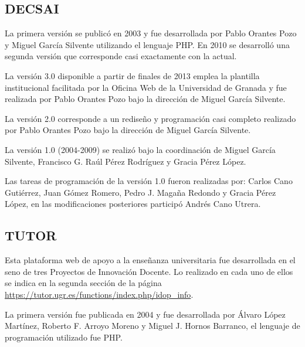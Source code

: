 \subsection{DECSAI}

La primera versión se publicó en 2003 y fue desarrollada por Pablo Orantes Pozo y Miguel García Silvente utilizando el lenguaje PHP. En 2010 se desarrolló una segunda versión que corresponde casi exactamente con la actual.

\bigskip
La versión 3.0 disponible a partir de finales de 2013 emplea la plantilla institucional facilitada por la Oficina Web de la Universidad de Granada y fue realizada por Pablo Orantes Pozo bajo la dirección de Miguel García Silvente.

\bigskip
La versión 2.0 corresponde a un rediseño y programación casi completo realizado por Pablo Orantes Pozo bajo la dirección de Miguel García Silvente.

\bigskip
La versión 1.0 (2004-2009) se realizó bajo la coordinación de Miguel García Silvente, Francisco G. Raúl Pérez Rodríguez y Gracia Pérez López.

\bigskip
Las tareas de programación de la versión 1.0 fueron realizadas por: Carlos Cano Gutiérrez, Juan Gómez Romero, Pedro J. Magaña Redondo y Gracia Pérez López, en las modificaciones posteriores participó Andrés Cano Utrera.

\subsection{TUTOR}
Esta plataforma web de apoyo a la enseñanza universitaria fue desarrollada en el seno de tres Proyectos de Innovación Docente. Lo realizado en cada uno de ellos se indica en la segunda sección de la página \url{https://tutor.ugr.es/functions/index.php/idop_info}.

\bigskip
La primera versión fue publicada en 2004 y fue desarrollada por Álvaro López Martínez, Roberto F. Arroyo Moreno y Miguel J. Hornos Barranco, el lenguaje de programación utilizado fue PHP.
